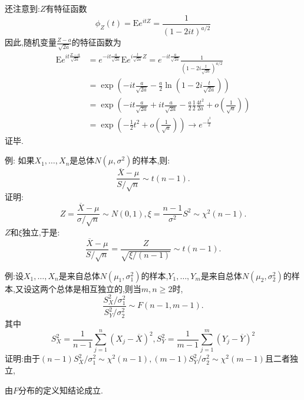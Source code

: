 	\begin{frame}
		还注意到:$Z$有特征函数
		\begin{equation}
		\phi_Z(t) = \mathrm{E}e^{itZ} = \frac{1}{\left(1-2it\right)^{a/2}}
		\end{equation}
		因此,随机变量$\frac{Z-a}{\sqrt{2a}}$的特征函数为
		\begin{equation}
		\begin{split}
		\mathrm{E}e^{it\frac{Z-a}{\sqrt{2a}}}&=e^{-it\frac{a}{\sqrt{2a}}}\mathrm{E}e^{i\frac{t}{\sqrt{2a}}Z} = e^{-it\frac{a}{\sqrt{2a}}}\frac{1}{\left(1-2i\frac{t}{\sqrt{2a}}\right)^{a/2}} \\
		&= \exp\left(-it\frac{a}{\sqrt{2a}}-\frac{a}{2}\ln(1-2i\frac{t}{\sqrt{2a}})\right) \\
		&= \exp\left(-it\frac{a}{\sqrt{2a}}+it\frac{a}{\sqrt{2a}}-\frac{a}{2}\frac{1}{2}\frac{4t^2}{2a}+o(\frac{1}{\sqrt{a}})  \right)\\
		&=\exp\left(-\frac{1}{2}t^2+o(\frac{1}{\sqrt{a}})  \right)\rightarrow e^{-\frac{t^2}{2}}
		\end{split}
		\end{equation}证毕.
	\end{frame}

	\begin{frame}
		例: 如果$X_1,\dots,X_n$是总体$N(\mu,\sigma^2)$的样本,则:
		\alert{
			\begin{equation}
				\frac{\overline{X}-\mu}{S/\sqrt{n}}\sim t(n-1).
			\end{equation}
		}
		证明:
		\begin{equation}
			Z = \frac{\overline{X}-\mu}{\sigma/\sqrt{n}}\sim N(0,1),\xi = \frac{n-1}{\sigma^2}S^2\sim\chi^2(n-1).
		\end{equation}
		$Z$和$\xi$独立,于是:
		\begin{equation}
			\frac{\overline{X}-\mu}{S/\sqrt{n}} = \frac{Z}{\sqrt{\xi/(n-1)}}\sim t(n-1).
		\end{equation}
	\end{frame}

	\begin{frame}
		例:设$X_1,\dots,X_n$是来自总体$N(\mu_1,\sigma_1^2)$的样本,$Y_1,\dots,Y_m$是来自总体$N(\mu_2,\sigma_2^2)$的样本,又设这两个总体是相互独立的,则当$m,n\geqslant 2$时,
		\alert{
			\begin{equation}
				\frac{S_X^2/\sigma_1^2}{S_Y^2/\sigma_2^2}\sim F(n-1,m-1).
			\end{equation}
		}
		其中
		\begin{equation}
			S_X^2 = \frac{1}{n-1}\sum_{j=1}^{n}(X_j-\overline{X})^2,S_Y^2 = \frac{1}{m-1}\sum_{j=1}^{m}(Y_j-\overline{Y})^2
		\end{equation}
		证明:由于$(n-1)S_X^2/\sigma_1^2\sim\chi^2(n-1),(m-1)S_Y^2/\sigma_2^2\sim\chi^2(m-1)$且二者独立,
		
		由$F$分布的定义知结论成立.
	\end{frame}

